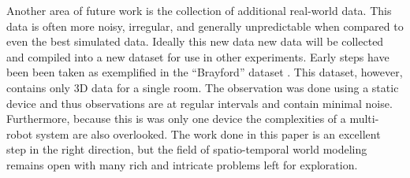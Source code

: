     Another area of future work is the collection
    of additional real-world data. This data is often more noisy, irregular,
    and generally unpredictable when compared to even the best simulated data.
    Ideally this new data new data will be collected and compiled into a
    new dataset for use in other experiments. Early steps have been been taken as exemplified in the
    ``Brayford'' dataset \cite{Krajnik2014}. This dataset, however, contains
    only 3D data for a single room. The observation was done using a static device and
    thus observations are at regular intervals and contain minimal noise.
    Furthermore, because this is was only one device the complexities of a
    multi-robot system are also overlooked. The work done in this paper is an
    excellent step in the right direction, but the field of spatio-temporal
    world modeling remains open with many rich and intricate problems left for
    exploration. \\


